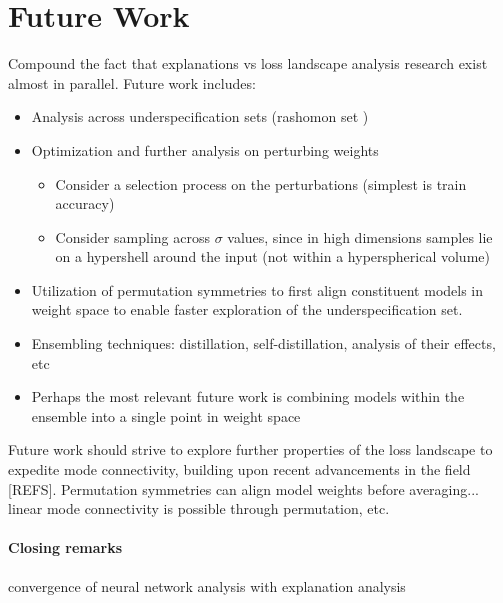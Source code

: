\section{Future Work}
\label{sec:future}

Compound the fact that explanations vs loss landscape analysis research exist almost in parallel. Future work includes:

\begin{itemize}
    \item Analysis across underspecification sets (rashomon set \citep{xin2022})
    \item Optimization and further analysis on perturbing weights
    \begin{itemize}
        \item Consider a selection process on the perturbations (simplest is train accuracy)
        \item Consider sampling across $\sigma$ values, since in high dimensions samples lie on a hypershell around the input (not within a hyperspherical volume)
    \end{itemize}
    \item Utilization of permutation symmetries to first align constituent models in weight space to enable faster exploration of the underspecification set. \citep{tatro2020, singh2020, ainsworth2023}
    \item Ensembling techniques: distillation, self-distillation, analysis of their effects, etc 
    \item Perhaps the most relevant future work is combining models within the ensemble into a single point in weight space
\end{itemize}

Future work should strive to explore further properties of the loss landscape to expedite mode connectivity, building upon recent advancements in the field [REFS]. Permutation symmetries can align model weights before averaging... linear mode connectivity is possible through permutation, etc.


\paragraph{Closing remarks} convergence of neural network analysis with explanation analysis